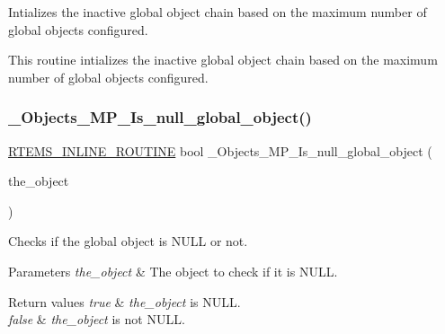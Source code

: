 Intializes the inactive global object chain based on the maximum number of global objects configured. 

This routine intializes the inactive global object chain based on the maximum number of global objects configured. \mbox{\label{group__RTEMSScoreObjectMP_ga56fbd183d677d4aa85be7b6ce66de13b}} 
\subsubsection{\texorpdfstring{\_Objects\_MP\_Is\_null\_global\_object()}{\_Objects\_MP\_Is\_null\_global\_object()}}
{\footnotesize\ttfamily \mbox{\hyperlink{group__RTEMSScoreBaseDefs_gac216239df231d5dbd15e3520b0b9313f}{R\+T\+E\+M\+S\+\_\+\+I\+N\+L\+I\+N\+E\+\_\+\+R\+O\+U\+T\+I\+NE}} bool \+\_\+\+Objects\+\_\+\+M\+P\+\_\+\+Is\+\_\+null\+\_\+global\+\_\+object (\begin{DoxyParamCaption}\item[{Objects\+\_\+\+M\+P\+\_\+\+Control $\ast$}]{the\+\_\+object }\end{DoxyParamCaption})}



Checks if the global object is N\+U\+LL or not. 


\begin{DoxyParams}{Parameters}
{\em the\+\_\+object} & The object to check if it is N\+U\+LL.\\
\hline
\end{DoxyParams}

\begin{DoxyRetVals}{Return values}
{\em true} & {\itshape the\+\_\+object} is N\+U\+LL. \\
\hline
{\em false} & {\itshape the\+\_\+object} is not N\+U\+LL. \\
\hline
\end{DoxyRetVals}
\mbox{\label{group__RTEMSScoreObjectMP_gae1144d0c54b95368022bd861539e9694}} 
